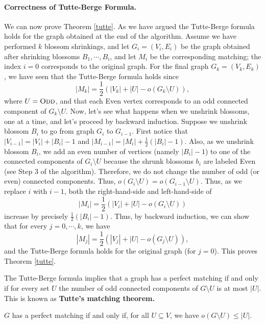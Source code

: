 \documentclass[12pt]{article}
\begin{document}
\paragraph{Correctness of Tutte-Berge Formula.} We can now prove
Theorem \ref{tutte}. As we have argued the Tutte-Berge formula holds
for the graph obtained at the end of the algorithm. Assume we have
performed $k$ blossom shrinkings, and let $G_i=(V_i,E_i)$ be the
graph obtained after shrinking blossoms $B_1, \cdots, B_i$, and let
$M_i$ be the corresponding matching; the index $i=0$ corresponds to
the original graph. For the final graph $G_k=(V_k,E_k)$, we have seen
that the Tutte-Berge formula holds since 
$$|M_k|=\frac{1}{2} \left( |V_k|+|U|-o(G_k\setminus U) \right),$$
where $U=\textsc{Odd}$, and that each {\sc Even} vertex corresponds to an odd
connected component of $G_k\setminus U$. Now, 
let's see what happens when we unshrink blossoms, one at a time, and
let's proceed by backward induction. Suppose 
we unshrink blossom $B_i$ to go from graph $G_i$ to $G_{i-1}$. First
notice that  $|V_{i-1}|=|V_i|+|B_i|-1$ and
$|M_{i-1}|=|M_i|+\frac{1}{2} (|B_i|-1)$. Also, as we unshrink blossom
$B_i$, we add an even number of vertices (namely $|B_i|-1$) to one of the connected
components of $G_i\setminus U$ because the shrunk blossoms $b_i$ are labeled {\sc Even} (see Step 3 of the algorithm). Therefore, we do not change the
number of odd (or even) connected components. Thus, $o(G_i\setminus
U)=o(G_{i-1}\setminus U)$. Thus, as we replace $i$ with $i-1$, both
the right-hand-side and left-hand-side of 
$$|M_i|=\frac{1}{2} \left( |V_i|+|U|-o(G_i\setminus U) \right)$$
increase by precisely $\frac{1}{2}(|B_i|-1)$.  
Thus, by backward induction, we can show
that for every $j=0,\cdots,k$, we have
$$|M_j|=\frac{1}{2} \left( |V_j|+|U|-o(G_j\setminus U) \right),$$
and the Tutte-Berge formula holds for the original graph (for
$j=0$). This proves Theorem \ref{tutte}.

The Tutte-Berge formula implies that a graph has a perfect matching if
and only if for every set $U$ the number of odd connected components
of $G\setminus U$ is at most $|U|$. This is known as {\bf Tutte's
  matching theorem.}  

\begin{theorem}
$G$ has a perfect matching if and only if, for all $U\subseteq V$, we
have $o(G\setminus U)\leq |U|$. 
\end{theorem}
\end{document}
